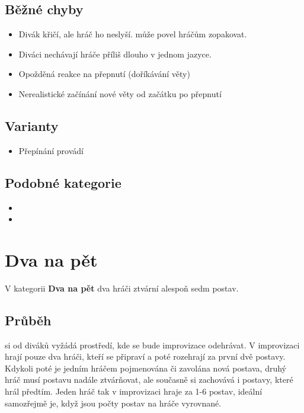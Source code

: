 \subsection{Běžné chyby} \begin{itemize}
\item Divák křičí, ale hráč ho neslyší.  může povel hráčům zopakovat.
\item Diváci nechávají hráče příliš dlouho v jednom jazyce.
\item Opožděná reakce na přepnutí (doříkávání věty)
\item Nerealistické začínání nové věty od začátku po přepnutí
\end{itemize}
 
\subsection{Varianty} \begin{itemize}
\item Přepínání provádí 
\end{itemize}
 
\subsection{Podobné kategorie} \begin{itemize}
\item  {}
\item  {}
\end{itemize}
 
 
 
 
\needspace{5cm} \section{Dva na pět} \label{dva na pět}  
 
V kategorii \textbf{Dva na pět}{} dva hráči ztvární alespoň sedm postav. 
 
\subsection{Průběh}  si od diváků vyžádá prostředí, kde se bude improvizace odehrávat. V improvizaci hrají pouze dva hráči, kteří se připraví a poté rozehrají za první dvě postavy. Kdykoli poté je jedním hráčem pojmenována či zavolána nová postava, druhý hráč musí postavu nadále ztvárňovat, ale současně si zachovává i postavy, které hrál předtím. Jeden hráč tak v improvizaci hraje za 1-6 postav, ideální samozřejmě je, když jsou počty postav na hráče vyrovnané. 
 
